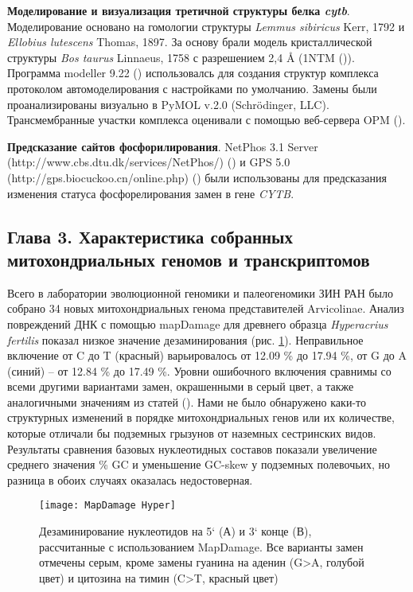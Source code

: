 \textbf{Моделирование и визуализация третичной структуры белка \textit{cytb}}. Моделирование основано на гомологии структуры \textit{Lemmus sibiricus} Kerr, 1792 и \textit{Ellobius lutescens} Thomas, 1897. За основу брали модель кристаллической структуры  \textit{Bos taurus} Linnaeus, 1758 с разрешением 2,4 Å (1NTM (\cite{Gao2003})). Программа modeller 9.22 (\cite{Webb2016}) использовалсь для создания структур комплекса протоколом автомоделирования с настройками по умолчанию. Замены были проанализированы визуально в PyMOL v.2.0 (Schrödinger, LLC). Трансмембранные участки комплекса оценивали с помощью веб-сервера OPM (\cite{Lomize2012}). 

\textbf{Предсказание сайтов фосфорилирования}. NetPhos 3.1 Server (http://www.cbs.dtu.dk/services/NetPhos/) (\cite{Blom2004}) и GPS 5.0 (http://gps.biocuckoo.cn/online.php) (\cite{Xue2011}) были использованы для предсказания изменения статуса фосфорелирования замен в гене \textit{CYTB}.


\subsection*{Глава 3. Характеристика собранных митохондриальных геномов и транскриптомов}

Всего в лаборатории эволюционной геномики и палеогеномики ЗИН РАН было собрано 34 новых митохондриальных генома представителей Arvicolinae. Анализ повреждений ДНК с помощью mapDamage для древнего образца \textit{Hyperacrius fertilis} показал низкое значение дезаминирования (рис. \ref{MapDamage}). Неправильное включение от C до T (красный) варьировалось от 12.09 \% до 17.94 \%, от G до A (синий) -- от 12.84 \% до 17.49 \%. Уровни ошибочного включения сравнимы со всеми другими вариантами замен, окрашенными в серый цвет, а также аналогичными значениям из статей (\cite{Molto2017}). Нами не было обнаружено каки-то структурных изменений в порядке митохондриальных генов или их количестве, которые отличали бы подземных грызунов от наземных сестринских видов. Результаты сравнения базовых нуклеотидных составов показали увеличение среднего значения \% GC и уменьшение GC-skew у подземных полевочьих, но разница в обоих случаях оказалась недостоверная.

\begin{figure}[h!]
	\begin{center}
		\texttt{[image: MapDamage Hyper]}
	\end{center}
	\caption{Дезаминирование нуклеотидов на 5` (А) и 3` конце (В), рассчитанные с использованием MapDamage. Все варианты замен отмечены серым, кроме замены гуанина на аденин (G>A, голубой цвет) и цитозина на тимин (C>T, красный цвет)}\label{MapDamage}
\end{figure}


